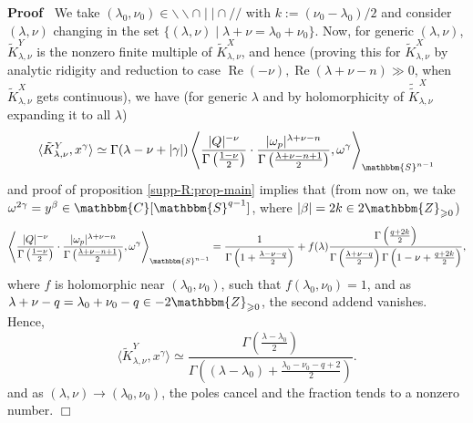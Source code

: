 \documentclass{article}
\newcommand{\assign}{:=}
\newcommand{\tmop}[1]{\ensuremath{\operatorname{#1}}}
\renewenvironment{proof}{\noindent\textbf{Proof\ }}{\hspace*{\fill}$\Box$\medskip}
\theoremstyle{remark}
\begin{document}
\begin{proof}
  We take $(\lambda_0, \nu_0) \in \backslash\backslash \cap \mid \mid \cap /
  /$ with $k \assign (\nu_0 - \lambda_0) / 2$ and consider $(\lambda, \nu)$
  changing in the set $\{ (\lambda, \nu) \mid \lambda + \nu = \lambda_0 +
  \nu_0 \}$. Now, for generic $(\lambda, \nu)$, $\tilde{K}_{\lambda, \nu}^Y$
  is the nonzero finite multiple of $\tilde{K}_{\lambda, \nu}^X$, and hence
  (proving this for $\tilde{K}_{\lambda, \nu}^X$ by analytic ridigity and
  reduction to case $\tmop{Re} (- \nu), \tmop{Re} (\lambda + \nu - n) \gg 0$,
  when $\tilde{K}_{\lambda, \nu}^X$ gets continuous), we have (for generic
  $\lambda$ and by holomorphicity of $\widetilde{\tilde{K}}_{\lambda, \nu}^X$
  expanding it to all $\lambda$)
  \[ \langle \tilde{K}_{\lambda, \nu}^Y, x^{\gamma} \rangle \simeq \Gamma
     (\lambda - \nu + | \gamma |) \left\langle \frac{| Q |^{- \nu}}{\Gamma
     \left( \frac{1 - \nu}{2} \right)} \cdot \frac{| \omega_p |^{\lambda + \nu
     - n}}{\Gamma \left( \frac{\lambda + \nu - n + 1}{2} \right)},
     \omega^{\gamma} \right\rangle_{\mathbbm{S}^{n - 1}} \]
  and proof of proposition \ref{supp-R:prop-main} implies that (from now on,
  we take $\omega^{2 \gamma} = y^{\beta} \in \mathbbm{C} [\mathbbm{S}^{q -
  1}]$, where $| \beta | = 2 k \in 2\mathbbm{Z}_{\geqslant 0}$)
  \[ \left\langle \frac{| Q |^{- \nu}}{\Gamma \left( \frac{1 - \nu}{2}
     \right)} \cdot \frac{| \omega_p |^{\lambda + \nu - n}}{\Gamma \left(
     \frac{\lambda + \nu - n + 1}{2} \right)}, \omega^{\gamma}
     \right\rangle_{\mathbbm{S}^{n - 1}} = \frac{1}{\Gamma \left( 1 +
     \frac{\lambda - \nu - q}{2} \right)} + f (\lambda) \frac{\Gamma \left(
     \frac{q + 2 k}{2} \right)}{\Gamma \left( \frac{\lambda + \nu - q}{2}
     \right) \Gamma \left( 1 - \nu + \frac{q + 2 k}{2} \right)}, \]
  where $f$ is holomorphic near $(\lambda_0, \nu_0)$, such that $f (\lambda_0,
  \nu_0) = 1$, and as $\lambda + \nu - q = \lambda_0 + \nu_0 - q \in -
  2\mathbbm{Z}_{\geqslant 0}$, the second addend vanishes. Hence,
  \[ \langle \tilde{K}_{\lambda, \nu}^Y, x^{\gamma} \rangle \simeq
     \frac{\Gamma \left( \frac{\lambda - \lambda_0}{2} \right)}{\Gamma \left(
     (\lambda - \lambda_0) + \frac{\lambda_0 - \nu_0 - q + 2}{2} \right)} . \]
  and as $(\lambda, \nu) \rightarrow (\lambda_0, \nu_0)$, the poles cancel and
  the fraction tends to a nonzero number.
\end{proof}
\end{document}
